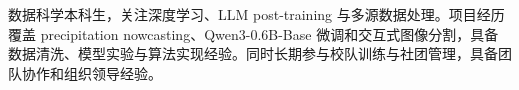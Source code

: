 

\begin{cvparagraph}
数据科学本科生，关注深度学习、LLM post-training 与多源数据处理。项目经历覆盖 precipitation nowcasting、Qwen3-0.6B-Base 微调和交互式图像分割，具备数据清洗、模型实验与算法实现经验。同时长期参与校队训练与社团管理，具备团队协作和组织领导经验。
\end{cvparagraph}
